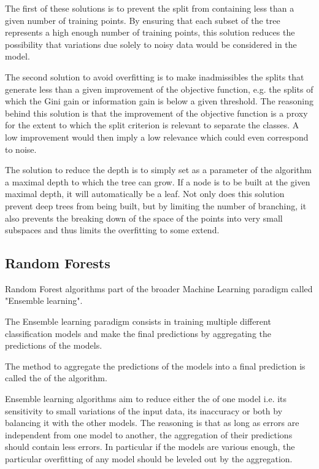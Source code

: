 The first of these solutions is to prevent the split from containing less than a given number of training points. By ensuring that each subset of the tree represents a high enough number of training points, this solution reduces the possibility that variations due solely to noisy data would be considered in the model.

The second solution to avoid overfitting is to make inadmissibles the splits that generate less than a given improvement of the objective function, e.g. the splits of which the Gini gain or information gain is below a given threshold. The reasoning behind this solution is that the improvement of the objective function is a proxy for the extent to which the split criterion is relevant to separate the classes. A low improvement would then imply a low relevance which could even correspond to noise.

The solution to reduce the depth is to simply set as a parameter of the algorithm a maximal depth to which the tree can grow. If a node is to be built at the given maximal depth, it will automatically be a leaf. Not only does this solution prevent deep trees from being built, but by limiting the number of branching, it also prevents the breaking down of the space of the points into very small subspaces and thus limits the overfitting to some extend.

\subsection{Random Forests}
Random Forest algorithms part of the broader Machine Learning paradigm called "Ensemble learning".
\begin{definition}
The Ensemble learning paradigm consists in training multiple different classification models and make the final predictions by aggregating the predictions of the models.
\end{definition}

The method to aggregate the predictions of the models into a final prediction is called the  of the algorithm.

Ensemble learning algorithms aim to reduce either the  of one model i.e. its sensitivity to small variations of the input data, its inaccuracy or both by balancing it with the other models. The reasoning is that as long as errors are independent from one model to another, the aggregation of their predictions should contain less errors. In particular if the models are various enough, the particular overfitting of any model should be leveled out by the aggregation.

